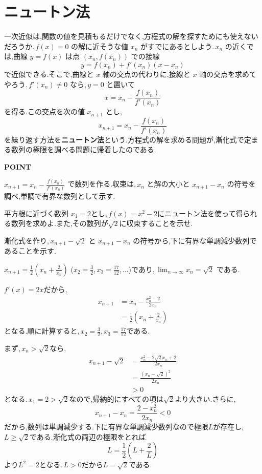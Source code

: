 \section{ニュートン法}\label{節:ニュートン法}
一次近似は,関数の値を見積もるだけでなく,方程式の解を探すためにも使えないだろうか.\,$f(x)=0$ の解に近そうな値 $x_n$ がすでにあるとしよう.\,$x_n$ の近くでは,曲線 $y=f(x)$ は点 $(x_n,f(x_n))$ での接線
\[
 y=f(x_n)+f'(x_n)(x-x_n)
\]
で近似できる.そこで,曲線と $x$ 軸の交点の代わりに,接線と $x$ 軸の交点を求めてやろう.\,$f'(x_n)\ne0$ なら,\,$y=0$ と置いて
\[
 x=x_n-\frac{f(x_n)}{f'(x_n)}
\]
を得る.この交点を次の値 $x_{n+1}$ とし,
\[
 x_{n+1}=x_n-\frac{f(x_n)}{f'(x_n)}
\]
を繰り返す方法を\textbf{ニュートン法}という.方程式の解を求める問題が,漸化式で定まる数列の極限を調べる問題に帰着したのである.

\begin{bookpoint}
\textbf{POINT}\par
$x_{n+1}=x_n-\frac{f(x_n)}{f'(x_n)}$ で数列を作る.収束は,\,$x_n$ と解の大小と $x_{n+1}-x_n$ の符号を調べ,単調で有界な数列として示す.
\end{bookpoint}

\begin{example}{平方根に近づく数列}
$x_1=2$とし,\,$f(x)=x^2-2$にニュートン法を使って得られる数列を求めよ.また,その数列が$\sqrt2$に収束することを示せ.
\end{example}
漸化式を作り,\,$x_{n+1}-\sqrt2$ と $x_{n+1}-x_n$ の符号から,下に有界な単調減少数列であることを示す.

$x_{n+1}=\frac12\left(x_n+\frac2{x_n}\right)$ ($x_2=\frac32$,\,$x_3=\frac{17}{12}$,\,$\ldots$)であり,\,$\lim_{n\to\infty}x_n=\sqrt2$ である.

$f'(x)=2x$だから,
\begin{align*}
 x_{n+1}&=x_n-\frac{x_n^2-2}{2x_n}\\
 &=\frac12\left(x_n+\frac2{x_n}\right)
\end{align*}
となる.順に計算すると,\,$x_2=\frac32$,\,$x_3=\frac{17}{12}$である.

まず,\,$x_n>\sqrt2$なら,
\begin{align*}
 x_{n+1}-\sqrt2
 &=\frac{x_n^2-2\sqrt2x_n+2}{2x_n}\\
 &=\frac{(x_n-\sqrt2)^2}{2x_n}\\
 &>0
\end{align*}
となる.\,$x_1=2>\sqrt2$なので,帰納的にすべての項は$\sqrt2$より大きい.さらに,
\[
 x_{n+1}-x_n=\frac{2-x_n^2}{2x_n}<0
\]
だから,数列は単調減少する.下に有界な単調減少数列なので極限$L$が存在し,\,$L\ge\sqrt2$である.漸化式の両辺の極限をとれば
\[
 L=\frac12\left(L+\frac2L\right)
\]
より$L^2=2$となる.\,$L>0$だから$L=\sqrt2$である.

